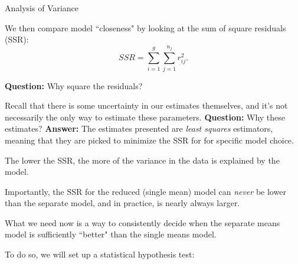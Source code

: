 \begin{frame}[allowframebreaks]{Analysis of Variance}
\begin{itemize}
{    \item We then compare model ``closeness" by looking at the sum of square residuals (SSR):
    $$
    SSR = \sum_{i = 1}^g\sum_{j = 1}^{n_j} r^2_{ij}.
    $$
    \item \textbf{Question:} Why square the residuals?
    \item Recall that there is some uncertainty in our estimates themselves, and it's not necessarily the only way to estimate these parameters. \textbf{Question:} Why these estimates? \textbf{Answer:} The estimates presented are \emph{least squares} estimators, meaning that they are picked to minimize the SSR for for specific model choice.
    }
    
    \framebreak
    
    \item The lower the SSR, the more of the variance in the data is explained by the model.
    \item Importantly, the SSR for the reduced (single mean) model can \emph{never} be lower than the separate model, and in practice, is nearly always larger.
    \item What we need now is a way to consistently decide when the separate means model is sufficiently ``better" than the single means model.
    \item To do so, we will set up a statistical hypothesis test:
    
  \end{itemize}
\end{frame}

